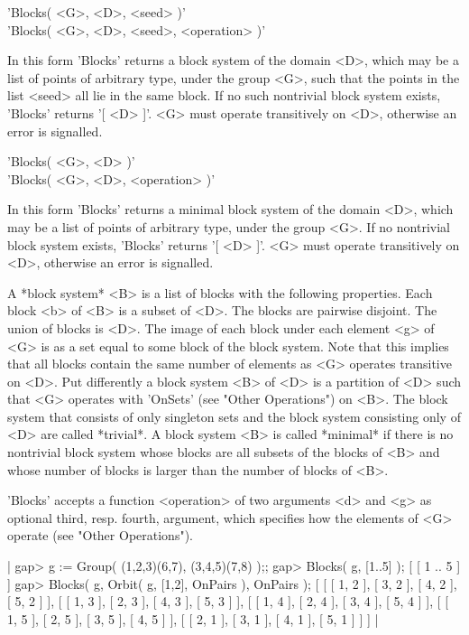 
'Blocks( <G>, <D>, <seed> )' \\
'Blocks( <G>, <D>, <seed>, <operation> )'

In this form 'Blocks' returns a block system of the domain <D>, which may
be a list of points of arbitrary type, under the group <G>, such that the
points  in  the  list <seed>  all  lie in  the  same block.  If  no  such
nontrivial  block  system exists,  'Blocks' returns '[ <D>  ]'.  <G> must
operate transitively on <D>, otherwise an error is signalled.

'Blocks( <G>, <D> )' \\
'Blocks( <G>, <D>, <operation> )'

In this form 'Blocks' returns a minimal  block system of the domain  <D>,
which may be a list of points of arbitrary type, under the group <G>.  If
no nontrivial  block system exists, 'Blocks' returns '[ <D> ]'.  <G> must
operate transitively on <D>, otherwise an error is signalled.

A *block system* <B> is  a list of blocks  with the following properties.
Each block <b> of  <B>  is a subset of   <D>.   The blocks are   pairwise
disjoint.   The union of blocks  is <D>.  The  image  of each block under
each element  <g> of <G> is as  a set  equal to  some block of  the block
system.  Note that  this implies that all  blocks contain the same number
of elements as <G>  operates transitive on <D>.   Put differently a block
system  <B> of  <D>  is a partition  of <D>  such that  <G> operates with
'OnSets' (see "Other Operations") on <B>.  The block system that consists
of  only singleton sets  and the block system consisting  only of <D> are
called *trivial*.  A block system <B> is called *minimal*  if there is no
nontrivial block system whose blocks are all subsets of the blocks of <B>
and whose number of blocks is larger than the number of blocks of <B>.

'Blocks' accepts a function <operation>  of two  arguments <d> and <g> as
optional third, resp. fourth, argument, which  specifies how the elements
of <G> operate (see "Other Operations").

|    gap> g := Group( (1,2,3)(6,7), (3,4,5)(7,8) );;
    gap> Blocks( g, [1..5] );
    [ [ 1 .. 5 ] ]
    gap> Blocks( g, Orbit( g, [1,2], OnPairs ), OnPairs );
    [ [ [ 1, 2 ], [ 3, 2 ], [ 4, 2 ], [ 5, 2 ] ],
      [ [ 1, 3 ], [ 2, 3 ], [ 4, 3 ], [ 5, 3 ] ],
      [ [ 1, 4 ], [ 2, 4 ], [ 3, 4 ], [ 5, 4 ] ],
      [ [ 1, 5 ], [ 2, 5 ], [ 3, 5 ], [ 4, 5 ] ],
      [ [ 2, 1 ], [ 3, 1 ], [ 4, 1 ], [ 5, 1 ] ] ] |

